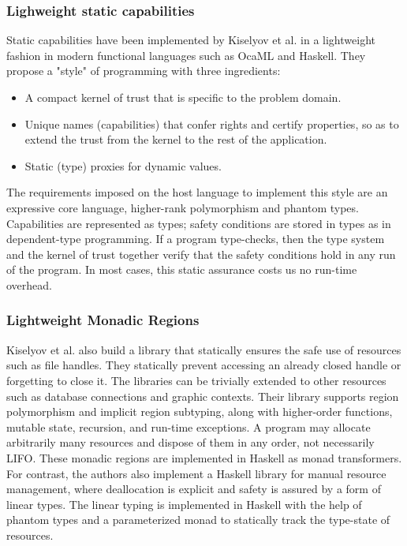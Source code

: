 \subsubsection{Lighweight static capabilities}
Static capabilities have been implemented by Kiselyov et al. \cite{5_3} in a lightweight fashion in modern functional languages such as OcaML and Haskell. They propose a "style" of programming with three ingredients:
\begin{itemize}
\item A compact kernel of trust that is specific  to the problem domain.
\item Unique names (capabilities) that confer rights and certify properties, so as to extend the trust from the kernel to the rest of the application.
\item Static (type) proxies for dynamic values.
\end{itemize}
The requirements imposed on the host language to implement this style are an expressive core language, higher-rank polymorphism and phantom types. Capabilities are represented as types; safety conditions are stored in types as in dependent-type programming. If a program type-checks, then the type system and the kernel of trust together verify that the safety conditions hold in any run of the program. In most cases, this static assurance costs us no run-time overhead.

\subsubsection{Lightweight Monadic Regions}
Kiselyov et al. \cite{5_1} also build a library that statically ensures the safe use of resources such as file handles. They statically prevent accessing an already closed handle or forgetting to close it. The libraries can be trivially extended to other resources such as database connections and graphic contexts. Their library supports region polymorphism and implicit region subtyping, along with higher-order functions, mutable state, recursion, and run-time exceptions. A program may allocate arbitrarily many resources and dispose of them in any order, not necessarily LIFO. These monadic regions are implemented in Haskell as monad transformers. For contrast, the authors also implement a Haskell library for manual resource management, where deallocation is explicit and safety is assured by a form of linear types. The linear typing is implemented in Haskell with the help of phantom types and a parameterized monad to statically track the type-state of resources.


